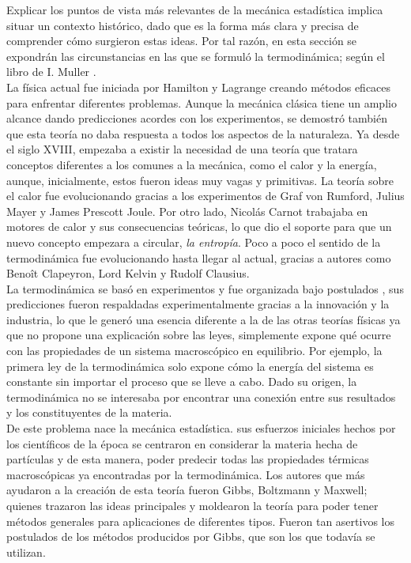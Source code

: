 Explicar los puntos de vista más relevantes de la mecánica estadística implica situar un contexto histórico, dado que es la forma más clara y precisa de comprender cómo surgieron estas ideas. Por tal razón, en esta sección se expondrán las circunstancias en las que se formuló la termodinámica; según el libro de I. Muller  \cite{MullerHistory}.
\\
La física actual fue iniciada por Hamilton y Lagrange creando métodos eficaces para enfrentar diferentes problemas. Aunque la mecánica clásica tiene un amplio alcance dando predicciones acordes con los experimentos, se demostró también que esta teoría no daba respuesta a todos los aspectos de la naturaleza. Ya desde el siglo XVIII, empezaba a existir la necesidad de una teoría que tratara conceptos diferentes a los comunes a la mecánica, como el calor y la energía, aunque, inicialmente, estos fueron ideas muy vagas y primitivas. La teoría sobre el calor fue evolucionando gracias a los experimentos de Graf von Rumford, Julius Mayer y James Prescott Joule. Por otro lado, Nicolás Carnot trabajaba en motores de calor y sus consecuencias teóricas, lo que dio el soporte para que un nuevo concepto empezara a circular, \textit{la entropía}. Poco a poco el sentido de la termodinámica fue evolucionando hasta llegar al actual, gracias a autores como Benoît Clapeyron, Lord Kelvin y Rudolf Clausius.
\\
La termodinámica se basó en experimentos y fue organizada bajo postulados \cite{CallenThermo}, sus predicciones fueron respaldadas experimentalmente gracias a la innovación y la industria, lo que le generó una esencia diferente a la de las otras teorías físicas ya que no propone una explicación sobre las leyes, simplemente expone qué ocurre con las propiedades de un sistema macroscópico en equilibrio. Por ejemplo, la primera ley de la termodinámica solo expone cómo la energía del sistema es constante sin importar el proceso que se lleve a cabo. Dado su origen, la termodinámica no se interesaba por encontrar una conexión entre sus resultados y los constituyentes de la materia.
\\
De este problema nace la mecánica estadística. sus esfuerzos iniciales hechos por los científicos de la época se centraron en considerar la materia hecha de partículas y de esta manera, poder predecir todas las propiedades térmicas macroscópicas ya encontradas por la termodinámica. Los autores que más ayudaron a la creación de esta teoría fueron Gibbs, Boltzmann y Maxwell; quienes trazaron las ideas principales y moldearon la teoría para poder tener métodos generales para aplicaciones de diferentes tipos. Fueron tan asertivos los postulados de los métodos producidos por Gibbs, que son los que todavía se utilizan.
\\
\\
